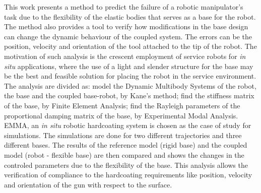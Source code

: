 \begin{foreignabstract}

		
This work presents a method to predict the failure of a robotic manipulator's
task due to the flexibility of the elastic bodies that serves as a base for the
robot. The method also provides a tool to verify how modifications in the base
design can change the dynamic behaviour of the coupled system. The errors can be
the position, velocity and orientation of the tool attached to the tip of the
robot.
The motivation of such analysis is the crescent employment of service robots for
\textit{in situ} applications, where the use of a light and slender structure
for the base may be the best and feasible solution for placing the robot in the
service environment. The analysis are divided as: model the Dynamic Multibody
Systems of the robot, the base and the coupled base-robot, by Kane's method;
find the stiffness matrix of the base, by Finite Element Analysis; find the
Rayleigh parameters of the proportional damping matrix of the base, by
Experimental Modal Analysis.
EMMA, an \textit{in situ} robotic hardcoating system is chosen as the case of
study for simulations. The simulations are done for two different trajectories
and three different bases. The results of the reference model (rigid base) and
the coupled model (robot - flexible base) are then compared and shows the
changes in the controled parameters due to the flexibility of the base. This
analysis allows the verification of compliance to the hardcoating requirements
like position, velocity and orientation of the gun with respect to the surface.





\end{foreignabstract}

